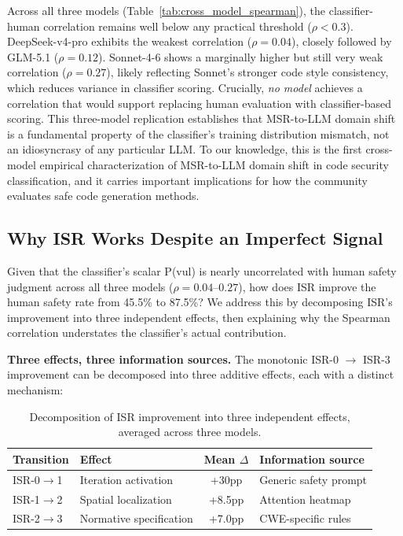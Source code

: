 \documentclass[10pt,conference]{IEEEtran}
\begin{document}
Across all three models (Table~\ref{tab:cross_model_spearman}), the classifier-human correlation remains well below any practical threshold ($\rho < 0.3$). DeepSeek-v4-pro exhibits the weakest correlation ($\rho=0.04$), closely followed by GLM-5.1 ($\rho=0.12$). Sonnet-4-6 shows a marginally higher but still very weak correlation ($\rho=0.27$), likely reflecting Sonnet's stronger code style consistency, which reduces variance in classifier scoring. Crucially, \textit{no model} achieves a correlation that would support replacing human evaluation with classifier-based scoring. This three-model replication establishes that MSR-to-LLM domain shift is a fundamental property of the classifier's training distribution mismatch, not an idiosyncrasy of any particular LLM. To our knowledge, this is the first cross-model empirical characterization of MSR-to-LLM domain shift in code security classification, and it carries important implications for how the community evaluates safe code generation methods.

\subsection{Why ISR Works Despite an Imperfect Signal}

Given that the classifier's scalar P(vul) is nearly uncorrelated with human safety judgment across all three models ($\rho=0.04$--$0.27$), how does ISR improve the human safety rate from 45.5\% to 87.5\%? We address this by decomposing ISR's improvement into three independent effects, then explaining why the Spearman correlation understates the classifier's actual contribution.

\textbf{Three effects, three information sources.}
The monotonic ISR-0 $\rightarrow$ ISR-3 improvement can be decomposed into three additive effects, each with a distinct mechanism:

\begin{table}[h]
\centering
\caption{Decomposition of ISR improvement into three independent effects, averaged across three models.}
\label{tab:three_effects}
\begin{tabular}{llcl}
\toprule
Transition & Effect & Mean $\Delta$ & Information source \\
\midrule
ISR-0$\rightarrow$1 & Iteration activation & +30pp & Generic safety prompt \\
ISR-1$\rightarrow$2 & Spatial localization & +8.5pp & Attention heatmap \\
ISR-2$\rightarrow$3 & Normative specification & +7.0pp & CWE-specific rules \\
\bottomrule
\end{tabular}
\end{table}
\end{document}
